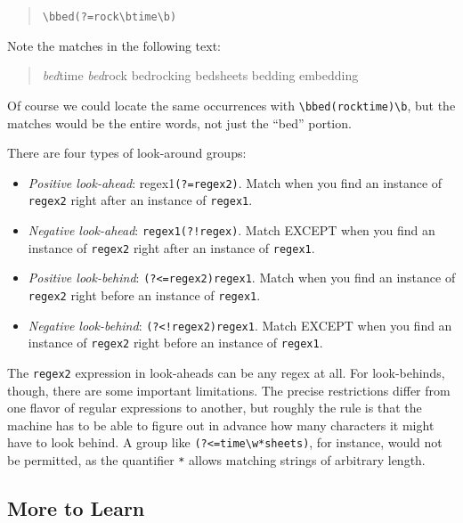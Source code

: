 \documentclass[]{book}
\providecommand{\tightlist}{%
  \setlength{\itemsep}{0pt}\setlength{\parskip}{0pt}}
\theoremstyle{definition}
\theoremstyle{definition}
\theoremstyle{definition}
\theoremstyle{remark}
\begin{document}
{\begin{quote}
\texttt{\textbackslash{}bbed(?=rock\textbackslash{}b\textbar{}time\textbackslash{}b)}
\end{quote}

Note the matches in the following text:

\begin{quote}
\emph{bed}time \emph{bed}rock bedrocking bedsheets bedding embedding
\end{quote}

Of course we could locate the same occurrences with
\texttt{\textbackslash{}bbed(rock\textbar{}time)\textbackslash{}b}, but
the matches would be the entire words, not just the ``bed'' portion.

There are four types of look-around groups: 

\begin{itemize}
\tightlist
\item
  \emph{Positive look-ahead}: regex1\texttt{(?=regex2)}. Match when you
  find an instance of \texttt{regex2} right after an instance of
  \texttt{regex1}.
\item
  \emph{Negative look-ahead}: \texttt{regex1(?!regex)}. Match EXCEPT
  when you find an instance of \texttt{regex2} right after an instance
  of \texttt{regex1}.
\item
  \emph{Positive look-behind}: \texttt{(?\textless{}=regex2)regex1}.
  Match when you find an instance of \texttt{regex2} right before an
  instance of \texttt{regex1}.
\item
  \emph{Negative look-behind}: \texttt{(?\textless{}!regex2)regex1}.
  Match EXCEPT when you find an instance of \texttt{regex2} right before
  an instance of \texttt{regex1}.
\end{itemize}

The \texttt{regex2} expression in look-aheads can be any regex at all.
For look-behinds, though, there are some important limitations. The
precise restrictions differ from one flavor of regular expressions to
another, but roughly the rule is that the machine has to be able to
figure out in advance how many characters it might have to look behind.
A group like \texttt{(?\textless{}=time\textbackslash{}w*sheets)}, for
instance, would not be permitted, as the quantifier \texttt{*} allows
matching strings of arbitrary length.

\subsection{More to Learn}\label{more-to-learn-1}

}
\end{document}
